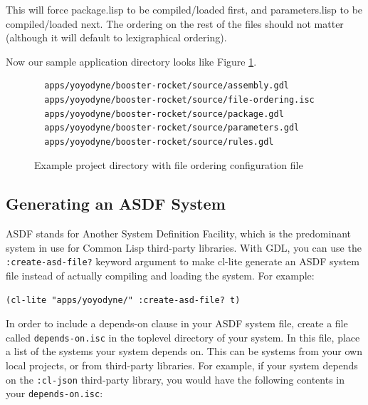 \documentclass [11pt]{book}
\begin{document}
This will force package.lisp to be compiled/loaded first, and
parameters.lisp to be compiled/loaded next. The ordering on the rest
of the files should not matter (although it will default to
lexigraphical ordering).



Now our sample application directory looks like Figure 
\ref{fig:yoyodyne-with-file-ordering-isc}.


\begin{figure}
\begin{lrbox}{\boxedverb}
\begin{minipage}{\linewidth}

\begin{verbatim}
  apps/yoyodyne/booster-rocket/source/assembly.gdl
  apps/yoyodyne/booster-rocket/source/file-ordering.isc
  apps/yoyodyne/booster-rocket/source/package.gdl
  apps/yoyodyne/booster-rocket/source/parameters.gdl
  apps/yoyodyne/booster-rocket/source/rules.gdl
\end{verbatim}
\end{minipage}
\end{lrbox}
\fbox{\usebox{\boxedverb}}

\caption{Example project directory with file ordering configuration file}

\label{fig:yoyodyne-with-file-ordering-isc}

\end{figure}


\subsection{Generating an ASDF System}

\label{subsec:generatinganasdfsystem}



ASDF stands for Another System Definition Facility, which
	is the predominant system in use for Common Lisp third-party
	libraries. With GDL, you can use the \texttt{:create-asd-file?} keyword argument to make cl-lite generate an ASDF system
file instead of actually compiling and loading the system. For example: 

\begin{verbatim}(cl-lite "apps/yoyodyne/" :create-asd-file? t)
\end{verbatim}



In order to include a depends-on clause in your ASDF system file, create a file called \texttt{depends-on.isc} in the toplevel directory of your system. In this file,
place a list of the systems your system depends on. This can be
systems from your own local projects, or from third-party libraries.
For example, if your system depends on the \texttt{:cl-json} third-party library, you would have the following contents in your \texttt{depends-on.isc}: 
\end{document}
